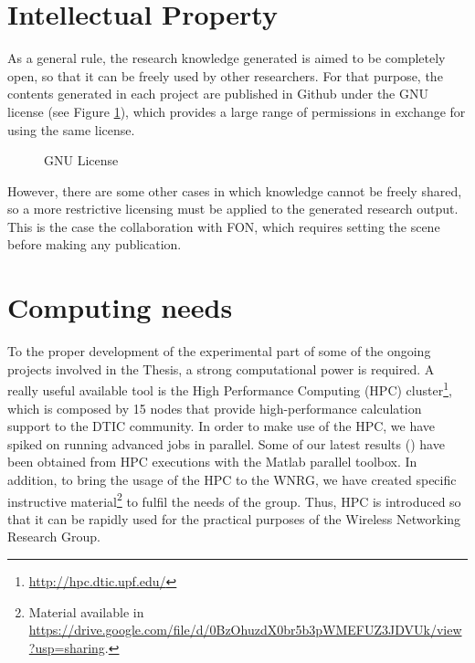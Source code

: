 \documentclass[12pt, a4paper,twoside]{article}
\begin{document}
	\section{Intellectual Property}
	\label{section:intellectual}		
	As a general rule, the research knowledge generated is aimed to be completely open, so that it can be freely used by other researchers. For that purpose, the contents generated in each project are published in Github under the GNU license (see Figure \ref{fig:gnu_license}), which provides a large range of permissions in exchange for using the same license. 
	\begin{figure}[t!]
		\centering
		\caption{GNU License}
		\label{fig:gnu_license}
	\end{figure}	
	However, there are some other cases in which knowledge cannot be freely shared, so a more restrictive licensing must be applied to the generated research output. This is the case the collaboration with FON, which requires setting the scene before making any publication.	

	\section{Computing needs}
	\label{section:computing}		
	To the proper development of the experimental part of some of the ongoing projects involved in the Thesis, a strong computational power is required. A really useful available tool is the High Performance Computing (HPC) cluster\footnote{\url{http://hpc.dtic.upf.edu/}}, which is composed by 15 nodes that provide high-performance calculation support to the DTIC community. In order to make use of the HPC, we have spiked on running advanced jobs in parallel. Some of our latest results (\cite{wilhelmi2017implications}) have been obtained from HPC executions with the Matlab parallel toolbox. In addition, to bring the usage of the HPC to the WNRG, we have created specific instructive material\footnote{Material available in \url{https://drive.google.com/file/d/0BzOhuzdX0br5b3pWMEFUZ3JDVUk/view?usp=sharing}.} to fulfil the needs of the group. Thus, HPC is introduced so that it can be rapidly used for the practical purposes of the Wireless Networking Research Group.	
		
\end{document}
